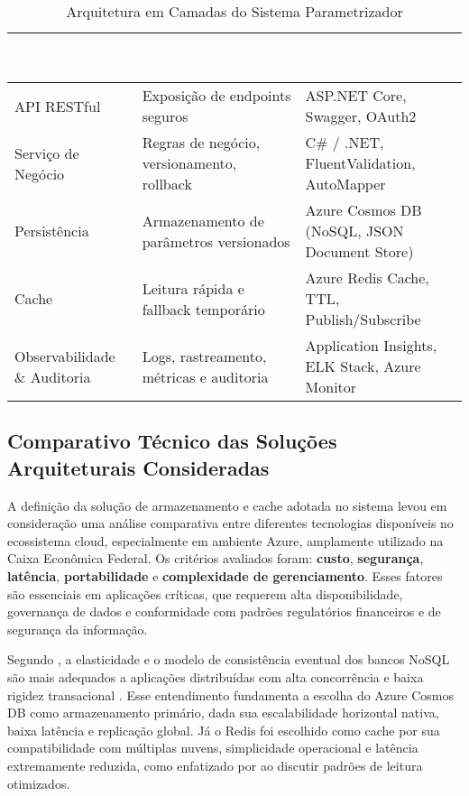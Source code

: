\begin{table}[h]
	\centering
	\caption{Arquitetura em Camadas do Sistema Parametrizador}
	\label{tab:arquitetura_camadas}
	\begin{tabular}{p{4cm}p{6cm}p{5cm}}
		\toprule
		\rowcolor{headerpurple}
		\textcolor{white}{\textbf{Camada}} & \textcolor{white}{\textbf{Responsabilidade Principal}} & \textcolor{white}{\textbf{Tecnologias Utilizadas}} \\
		\midrule
		API RESTful & Exposição de endpoints seguros & ASP.NET Core, Swagger, OAuth2 \\
		\rowcolor{lightpurple}
		Serviço de Negócio & Regras de negócio, versionamento, rollback & C\# / .NET, FluentValidation, AutoMapper \\
		Persistência & Armazenamento de parâmetros versionados & Azure Cosmos DB (NoSQL, JSON Document Store) \\
		\rowcolor{lightpurple}
		Cache & Leitura rápida e fallback temporário & Azure Redis Cache, TTL, Publish/Subscribe \\
		Observabilidade \& Auditoria & Logs, rastreamento, métricas e auditoria & Application Insights, ELK Stack, Azure Monitor \\
		\bottomrule
	\end{tabular}
\end{table}

\subsection*{Comparativo Técnico das Soluções Arquiteturais Consideradas}

A definição da solução de armazenamento e cache adotada no sistema levou em consideração uma análise comparativa entre diferentes tecnologias disponíveis no ecossistema cloud, especialmente em ambiente Azure, amplamente utilizado na Caixa Econômica Federal. Os critérios avaliados foram: \textbf{custo}, \textbf{segurança}, \textbf{latência}, \textbf{portabilidade} e \textbf{complexidade de gerenciamento}. Esses fatores são essenciais em aplicações críticas, que requerem alta disponibilidade, governança de dados e conformidade com padrões regulatórios financeiros e de segurança da informação.

Segundo , a elasticidade e o modelo de consistência eventual dos bancos NoSQL são mais adequados a aplicações distribuídas com alta concorrência e baixa rigidez transacional \cite{Ruparelia2016}. Esse entendimento fundamenta a escolha do Azure Cosmos DB como armazenamento primário, dada sua escalabilidade horizontal nativa, baixa latência e replicação global. Já o Redis foi escolhido como cache por sua compatibilidade com múltiplas nuvens, simplicidade operacional e latência extremamente reduzida, como enfatizado por  ao discutir padrões de leitura otimizados.

